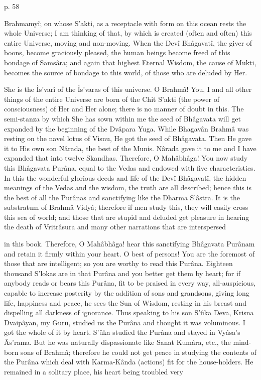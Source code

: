  

p. 58

 

Brahmamyî; on whose S’akti, as a receptacle with form on this ocean rests the whole Universe; I am thinking of that, by which is created (often and often) this entire Universe, moving and non-moving. When the Devî Bhâgavatî, the giver of boons, become graciously pleased, the human beings become freed of this bondage of Samsâra; and again that highest Eternal Wisdom, the cause of Mukti, becomes the source of bondage to this world, of those who are deluded by Her.

 

She is the Îs'varî of the Îs'varas of this universe. O Brahmâ! You, I and all other things of the entire Universe are born of the Chit S’akti (the power of consciousness) of Her and Her alone; there is no manner of doubt in this. The semi-stanza by which She has sown within me the seed of Bhâgavata will get expanded by the beginning of the Dvâpara Yuga. While Bhagavân Brahmâ was resting on the navel lotus of Visnu, He got the seed of Bhâgavata. Then He gave it to His own son Nârada, the best of the Munis. Nârada gave it to me and I have expanded that into twelve Skandhas. Therefore, O Mahâbhâga! You now study this Bhâgavata Purâna, equal to the Vedas and endowed with five characteristics. In this the wonderful glorious deeds and life of the Devî Bhâgavatî, the hidden meanings of the Vedas and the wisdom, the truth are all described; hence this is the best of all the Purânas and sanctifying like the Dharma S’âstra. It is the substratum of Brahmâ Vidyâ; therefore if men study this, they will easily cross this sea of world; and those that are stupid and deluded get pleasure in hearing the death of Vritrâsura and many other narrations that are interspersed

in this book. Therefore, O Mahâbhâga! hear this sanctifying Bhâgavata Purânam and retain it firmly within your heart. O best of persons! You are the foremost of those that are intelligent; so you are worthy to read this Purâna. Eighteen thousand S'lokas are in that Purâna and you better get them by heart; for if anybody reads or bears this Purâna, fit to be praised in every way, all-auspicious, capable to increase posterity by the addition of sons and grandsons, giving long life, happiness and peace, he sees the Sun of Wisdom, resting in his breast and dispelling all darkness of ignorance. Thus speaking to his son S’ûka Deva, Krisna Dvaipâyan, my Guru, studied us the Purâna and thought it was voluminous. I got the whole of it by heart. S'ûka studied the Purâna and stayed in Vyâsa's Âs'rama. But he was naturally dispassionate like Sanat Kumâra, etc., the mind-born sons of Brahmâ; therefore he could not get peace in studying the contents of the Purâna which deal with Karma-Kânda (actions) fit for the house-holders. He remained in a solitary place, his heart being troubled very

